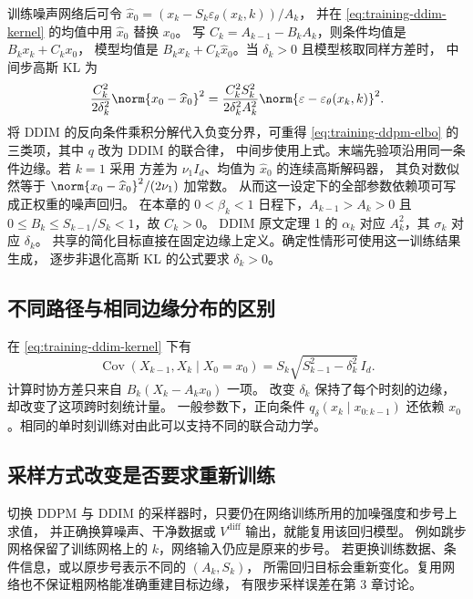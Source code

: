 训练噪声网络后可令
\(\widehat x_0=(x_k-S_k\varepsilon_\theta(x_k,k))/A_k\)，
并在 \eqref{eq:training-ddim-kernel} 的均值中用 \(\widehat x_0\) 替换 \(x_0\)。
写 \(C_k=A_{k-1}-B_k A_k\)，则条件均值是 \(B_kx_k+C_k x_0\)，
模型均值是 \(B_kx_k+C_k\widehat x_0\)。当 \(\delta_k>0\) 且模型核取同样方差时，
中间步高斯 KL 为
\begin{equation}
  \frac{C_k^2}{2\delta_k^2}\norm{x_0-\widehat x_0}^2
  =\frac{C_k^2 S_k^2}{2\delta_k^2 A_k^2}
          \norm{\varepsilon-\varepsilon_\theta(x_k,k)}^2 .
  \label{eq:training-ddim-weight}
\end{equation}
将 DDIM 的反向条件乘积分解代入负变分界，可重得
\eqref{eq:training-ddpm-elbo} 的三类项，其中 \(q\) 改为 DDIM 的联合律，
中间步使用上式。末端先验项沿用同一条件边缘。若 \(k=1\) 采用
方差为 \(\nu_1 I_d\)、均值为 \(\widehat x_0\) 的连续高斯解码器，
其负对数似然等于 \(\norm{x_0-\widehat x_0}^2/(2\nu_1)\) 加常数。
从而这一设定下的全部参数依赖项可写成正权重的噪声回归。
在本章的 \(0<\beta_k<1\) 日程下，\(A_{k-1}>A_k>0\) 且
\(0\le B_k\le S_{k-1}/S_k<1\)，故 \(C_k>0\)。
DDIM 原文定理 1 的 \(\alpha_k\) 对应 \(A_k^2\)，其 \(\sigma_k\) 对应 \(\delta_k\)。
共享的简化目标直接在固定边缘上定义。确定性情形可使用这一训练结果生成，
逐步非退化高斯 KL 的公式要求 \(\delta_k>0\)。

\subsection{不同路径与相同边缘分布的区别}

在 \eqref{eq:training-ddim-kernel} 下有
\[
  \operatorname{Cov}(X_{k-1},X_k\mid X_0=x_0)
    = S_k\sqrt{S_{k-1}^2-\delta_k^2}\,I_d .
\]
计算时协方差只来自 \(B_k(X_k-A_kx_0)\) 一项。
改变 \(\delta_k\) 保持了每个时刻的边缘，却改变了这项跨时刻统计量。
一般参数下，正向条件 \(q_\delta(x_k\mid x_{0:k-1})\)
还依赖 \(x_0\)。相同的单时刻训练对由此可以支持不同的联合动力学。

\subsection{采样方式改变是否要求重新训练}

切换 DDPM 与 DDIM 的采样器时，只要仍在网络训练所用的加噪强度和步号上求值，
并正确换算噪声、干净数据或 \(V^{\mathrm{diff}}\) 输出，就能复用该回归模型。
例如跳步网格保留了训练网格上的 \(k\)，网络输入仍应是原来的步号。
若更换训练数据、条件信息，或以原步号表示不同的 \((A_k,S_k)\)，
所需回归目标会重新变化。复用网络也不保证粗网格能准确重建目标边缘，
有限步采样误差在第 3 章讨论。

